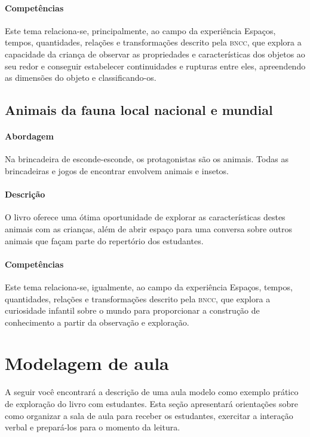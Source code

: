 \documentclass[11pt]{extarticle}
\begin{document}
\paragraph{Competências} Este tema relaciona-se, principalmente, ao 
campo da experiência Espaços, tempos, quantidades, relações e transformações 
descrito pela \textsc{bncc}, que explora a capacidade da criança de observar as propriedades e características dos objetos ao seu redor e conseguir estabelecer continuidades e rupturas entre eles, apreendendo as dimensões do objeto e classificando-os.

\subsection{Animais da fauna local nacional e mundial}

\paragraph{Abordagem} Na brincadeira de esconde-esconde, os protagonistas são os animais. 
Todas as brincadeiras e jogos de encontrar envolvem animais e insetos.

\paragraph{Descrição} O livro oferece uma ótima oportunidade de explorar 
as características destes animais com as crianças, além de abrir espaço para uma 
conversa sobre outros animais que façam parte do repertório dos estudantes. 

\paragraph{Competências} Este tema relaciona-se, igualmente, ao 
campo da experiência Espaços, tempos, quantidades, relações e transformações 
descrito pela \textsc{bncc}, que explora a curiosidade infantil sobre o mundo 
para proporcionar a construção de conhecimento a partir da observação e exploração. 


\section{Modelagem de aula}
A seguir você encontrará a descrição de uma aula modelo como exemplo 
prático de exploração do livro com estudantes. Esta seção apresentará 
orientações sobre como organizar a sala de aula para receber os 
estudantes, exercitar a interação verbal e prepará-los para o 
momento da leitura.
\end{document}
